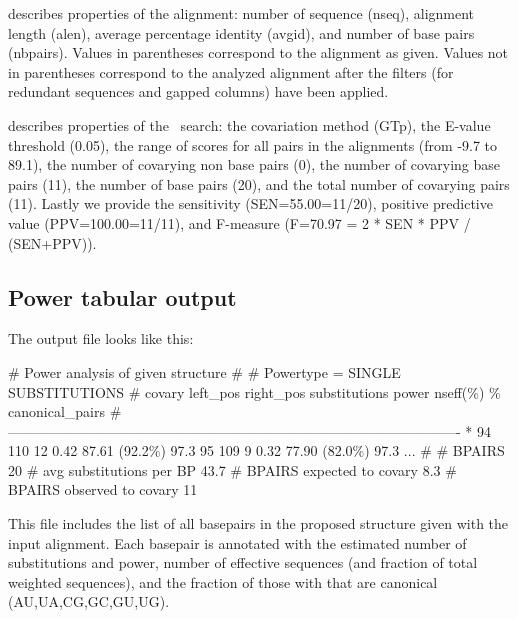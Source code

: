  \begin{sreitems}{}
 \item[\prog{First comment line}]describes properties of the alignment: number of
 sequence (nseq), alignment length (alen), average percentage identity
 (avgid), and number of base pairs (nbpairs).  Values in parentheses
 correspond to the alignment as given. Values not in parentheses
 correspond to the analyzed alignment after the filters (for redundant
 sequences and gapped columns) have been applied.

 \item[\prog{Second comment line}]describes properties of the \rscape\
   search: the covariation method (GTp), the E-value threshold (0.05),
   the range of scores for all pairs in the alignments (from -9.7 to
   89.1), the number of covarying non base pairs (0), the number of
   covarying base pairs (11), the number of base pairs (20), and the
   total number of covarying pairs (11). Lastly we provide the
   sensitivity (SEN=55.00=11/20), positive predictive value
   (PPV=100.00=11/11), and F-measure (F=70.97 = 2 * SEN * PPV /
   (SEN+PPV)).  \end{sreitems}

\subsection{Power tabular output}
The output file  looks like this:\\
\user{more tutorial/updated\_Arisong\_1.power}

\begin{sreoutput}
# Power analysis of given structure 
#
# Powertype = SINGLE SUBSTITUTIONS
# covary  left_pos      right_pos    substitutions      power   nseff(\%)       \% canonical_pairs
#-------------------------------------------------------------------------------------------------
     *    94            110             12              0.42    87.61 (92.2\%)   97.3
          95            109             9               0.32    77.90 (82.0\%)   97.3
...
#
# BPAIRS 20
# avg substitutions per BP  43.7
# BPAIRS expected to covary 8.3
# BPAIRS observed to covary 11
\end{sreoutput}
%
This file includes the list of all basepairs in the proposed structure
given with the input alignment. Each basepair is annotated with the
estimated number of substitutions and power, number of effective sequences (and fraction of total weighted sequences), and the fraction of those with that are canonical (AU,UA,CG,GC,GU,UG).

